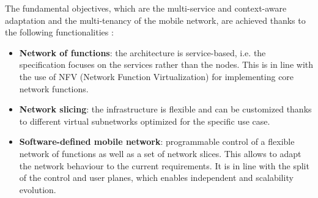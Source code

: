 \documentclass[conference,12pt,onecolumn]{IEEEtran}
\begin{document}
The fundamental objectives, which are the multi-service and context-aware adaptation and the multi-tenancy of the mobile network, are achieved thanks to the following functionalities \cite{rost2016mobile}:
\begin{itemize}
\item \textbf{Network of functions}: the architecture is service-based, i.e. the specification focuses on the services rather than the nodes. This is in  line with the use of NFV (Network Function Virtualization) for implementing core network functions.
\item \textbf{Network slicing}: the infrastructure is flexible and can be customized thanks to different virtual subnetworks optimized for the specific use case.
\item \textbf{Software-defined mobile network}: programmable control of a flexible network of functions as well as a set of network slices. This allows to adapt the network behaviour to the current requirements. It is in line with the split of the control and user planes, which enables independent and scalability evolution.
\end{itemize}
\end{document}
